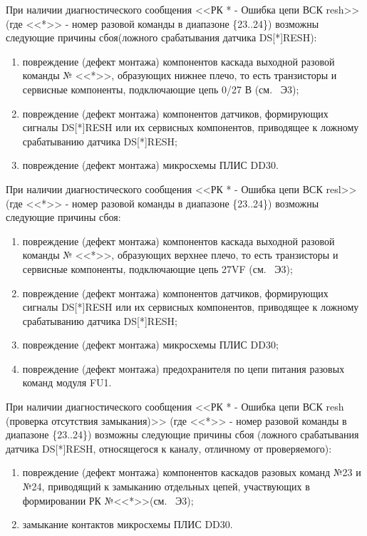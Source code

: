   \begin{sloppypar}
    \subpoint При наличии диагностического сообщения <<РК * - Ошибка цепи ВСК resh>> 
	      (где <<*>> - номер разовой команды в диапазоне \{23..24\}) возможны следующие причины сбоя(ложного срабатывания датчика DS[*]RESH):
	\label{subdefects:rk_out_27v_trig_fault_resh}
	\begin{enumerate}
	  \item повреждение (дефект монтажа) компонентов каскада выходной разовой команды № <<*>>, образующих нижнее плечо, 
		то есть транзисторы и сервисные компоненты, подключающие цепь 0/27 В (см. \DocProductSignature~Э3);
	  \item повреждение (дефект монтажа) компонентов датчиков, формирующих сигналы DS[*]RESH или их сервисных компонентов, приводящее к ложному срабатыванию датчика DS[*]RESH;
	  \item повреждение (дефект монтажа) микросхемы ПЛИС DD30.
	\end{enumerate} 
	
    \subpoint При наличии диагностического сообщения <<РК * - Ошибка цепи ВСК resl>> 
	      (где <<*>> - номер разовой команды в диапазоне \{23..24\}) возможны следующие причины сбоя:
	\label{subdefects:rk_out_27v_trig_fault_resl}
	\begin{enumerate}
	  \item повреждение (дефект монтажа) компонентов каскада выходной разовой команды № <<*>>, образующих верхнее плечо, 
		то есть транзисторы и сервисные компоненты, подключающие цепь 27VF (см. \DocProductSignature~Э3);
	  \item повреждение (дефект монтажа) компонентов датчиков, формирующих сигналы DS[*]RESH или их сервисных компонентов, приводящее к ложному срабатыванию датчика DS[*]RESH;
	  \item повреждение (дефект монтажа) микросхемы ПЛИС DD30;
	  \item повреждение (дефект монтажа) предохранителя по цепи питания разовых команд модуля FU1.
	\end{enumerate}
    
     \subpoint При наличии диагностического сообщения <<РК * - Ошибка цепи ВСК resh (проверка отсутствия замыкания)>> 
	      (где <<*>> - номер разовой команды в диапазоне \{23..24\}) возможны следующие причины сбоя (ложного срабатывания датчика DS[*]RESH, относящегося к каналу, отличному от проверяемого):
	  \label{subdefects:rk_out_27v_trig_fault_resh_cross}
	  \begin{enumerate}
	    \item повреждение (дефект монтажа) компонентов каскадов разовых команд №23 и №24, 
		  приводящий к замыканию отдельных цепей, участвующих в формировании РК №<<*>>(см. \DocProductSignature~Э3);    
	    \item замыкание контактов микросхемы ПЛИС DD30.
	  \end{enumerate}
      

\end{sloppypar}
